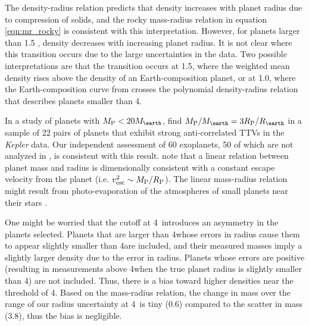 \documentclass[iop]{emulateapj}
\begin{document}
The \citet{Seager2007} density-radius relation predicts that density increases with planet radius due to compression of solids, and the rocky mass-radius relation in equation \ref{eqn:mr_rocky} is consistent with this interpretation.  However, for planets larger than 1.5 \rearth, density decreases with increasing planet radius.  It is not clear where this transition occurs due to the large uncertainties in the data.  Two possible interpretations are that the transition occurs at 1.5\rearth, where the weighted mean density rises above the density of an Earth-composition planet, or at 1.0\rearth, where the Earth-composition curve from \citet{Seager2007} crosses the polynomial density-radius relation that describes planets smaller than 4\rearth.

In a study of planets with $\mpl < 20\mearth$, \citet{WL2013} find $\mpl/\mearth = 3 \rpl/\rearth$ in a sample of 22 pairs of planets that exhibit strong anti-correlated TTVs in the \textit{Kepler} data.  Our independent assessment of 60 exoplanets, 50 of which are not analyzed in \citet{WL2013}, is consistent with this result.  \citet{WL2013} note that a linear relation between planet mass and radius is dimensionally consistent with a constant escape velocity from the planet (i.e. $v_{\mathrm{esc}}^2 \sim M_{\rm P}/R_{\rm P}$).  The linear mass-radius relation might result from photo-evaporation of the atmospheres of small planets near their stars \citep{Lopez2012}.

One might be worried that the cutoff at 4\rearth\ introduces an asymmetry in the planets selected.  Planets that are larger than 4\rearth whose errors in radius cause them to appear slightly smaller than 4\rearth are included, and their measured masses imply a slightly larger density due to the error in radius.  Planets whose errors are positive (resulting in measurements above 4\rearth when the true planet radius is slightly smaller than 4\rearth) are not included.  Thus, there is a bias toward higher densities near the threshold of 4\rearth.  Based on the mass-radius relation, the change in mass over the range of our radius uncertainty at 4\rearth\ is tiny (0.6\mearth) compared to the scatter in mass (3.8\mearth), thus the bias is negligible.
\end{document}
